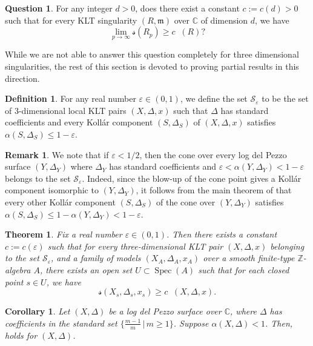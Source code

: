 \documentclass[11pt,reqno]{amsart}
\newcommand{\C}{\mathbb{C}}
\newcommand{\Z}{\mathbb{Z}}
\newcommand{\fm}{\mathfrak{m}}
\DeclareMathOperator{\Spec}{Spec}
\DeclareMathOperator{\nvol}{\widehat{vol}}
\numberwithin{equation}{section}
\newtheorem{thm}[prop] {Theorem}
\newtheorem{cor}[prop]{Corollary}
\theoremstyle{definition}
\newtheorem{rem}[prop] {Remark}
\newtheorem{defi}[prop] {Definition}
\newtheorem{que}[prop]{Question}
\newcommand{\s}{\mathscr{s}}
\begin{document}
\begin{que}
    For any integer $d>0$, does there exist a constant $c := c(d) > 0$ such that for every KLT singularity $(R, \fm)$ over $\C$ of dimension $d$, we have
    \[ \lim_{p \to \infty} \s (R_p) \geq c \nvol(R) ? \]
\end{que}

While we are not able to answer this question completely for three dimensional singularities, the rest of this section is devoted to proving partial results in this direction.

\begin{defi} \label{dfn:alphaboundedKollarcomponent}
    For any real number $\varepsilon \in (0,1)$, we define the set   $\mathscr{S}_\varepsilon$ to be the set of $3$-dimensional local KLT pairs $ (X, \Delta, x)$ such that $\Delta$ has standard coefficients and every Koll\'ar component $(S, \Delta_S) $ of $(X, \Delta, x)$ satisfies $\alpha(S, \Delta_S) \leq 1 - \varepsilon$.
\end{defi} 

\begin{rem}
    We note that if $\varepsilon < 1/2$, then the cone over every log del Pezzo surface $(Y, \Delta_Y)$ where $\Delta_Y$ has standard coefficients and $\varepsilon < \alpha(Y, \Delta_Y) < 1 - \varepsilon $ belongs to the set $\mathscr{S}_\varepsilon.$ Indeed, since the blow-up of the cone point gives a Koll\'ar component isomorphic to $(Y, \Delta_Y)$, it follows from the main theorem of \cite{CheltsovParkShramovAlphaandPLTBlowups} that every other Koll\'ar component $(S, \Delta_S)$ of the cone over $(Y, \Delta_Y)$ satisfies $\alpha(S, \Delta_S) \leq 1 - \alpha(Y, \Delta_Y) < 1 - \varepsilon.$ 
\end{rem}


\begin{thm} \label{thm:effectivelimFsig}
    Fix a real number $  \varepsilon  \in (0,1)$. Then there exists a constant $c := c(\varepsilon)$ such that for every three-dimensional KLT pair $(X, \Delta, x)$ belonging to the set $\mathscr{S}_\varepsilon$, and a family of models $(X_A, \Delta_A, x_A)$ over a smooth finite-type $\Z$-algebra $A$, there exists an open set $U \subset \Spec (A)$ such that for each closed point $s \in U$, we have 
    \[   \s  (X_s, \Delta_s,   x_s) \geq c \nvol (X, \Delta, x).\]
\end{thm}

\begin{cor} \label{cor:logdelPezzo}
    Let $(X, \Delta)$ be a log del Pezzo surface over $\C$, where $\Delta$ has coefficients in the standard set $\{\frac{m-1}{m} \, | \, m \geq 1 \}$. Suppose $\alpha(X, \Delta) < 1$. Then,  holds for $(X, \Delta)$.
\end{cor}
\end{document}
